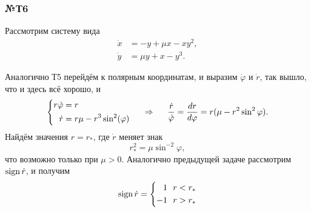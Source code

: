 \subsubsection*{№Т6}

 Рассмотрим систему вида
\begin{align*}
    \dot{x} &= - y + \mu x - x y^2,\\
    \dot{y} &= \mu y + x - y^3.
\end{align*}



Аналогично Т5 перейдём к полярным координатам, и выразим $\dot{\varphi}$ и $\dot{r}$, так вышло, что и здесь всё хорошо, и
\begin{equation*}
    \left\{\begin{aligned}
        r \dot{\varphi} &= r \\
        \dot{r} &= r \mu - r^3 \sin^2 (\varphi)
    \end{aligned}\right.
    \hspace{0.5cm} \Rightarrow \hspace{0.5cm}
    \frac{\dot{r}}{\dot{\varphi}} = \frac{d r}{d \varphi} = 
    r (\mu - r^2 \sin^2 \varphi).
\end{equation*}
Найдём значения $r = r_*$, где $\dot{r}$ меняет знак
\begin{equation*}
    r_*^2 = \mu \sin^{-2} \varphi,
\end{equation*}
что возможно только при $\mu > 0$. Аналогично предыдущей задаче рассмотрим $\mathop{\mathrm{sign}}\nolimits \dot{r}$, и получим
\begin{equation*}
    \mathop{\mathrm{sign}}\nolimits \dot{r} = 
    \left\{\begin{aligned}
        1 & \ \  r < r_*   \\
        -1 & \ \ r > r_*
    \end{aligned}\right.
\end{equation*}


